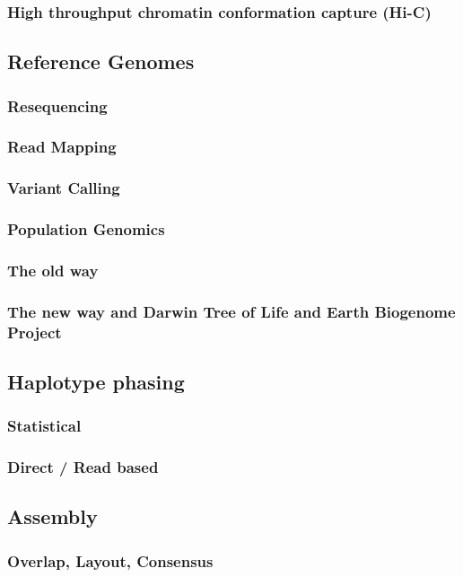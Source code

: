 \subsubsection{High throughput chromatin conformation capture (Hi-C)}



\subsection{Reference Genomes}
\subsubsection{Resequencing}
\subsubsection{Read Mapping}
\subsubsection{Variant Calling}
\subsubsection{Population Genomics}

\subsubsection{The old way}
\subsubsection{The new way and Darwin Tree of Life and Earth Biogenome Project}

\subsection{Haplotype phasing}
\subsubsection{Statistical}
\subsubsection{Direct / Read based}

\subsection{Assembly}
\subsubsection{Overlap, Layout, Consensus}
